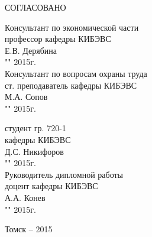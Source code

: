 \begin{singlespace}
 \begin{minipage}{0.48\linewidth}
 СОГЛАСОВАНО
 
 Консультант по экономической части\\
 профессор кафедры КИБЭВС \\
 \underline{\hspace{2.5cm}}Е.В. Дерябина \\
 "\underline{\hspace{1cm}}"\underline{\hspace{3cm}} 2015г.\\

 Консультант по вопросам охраны труда\\
 ст. преподаватель кафедры КИБЭВС \\
 \underline{\hspace{2.5cm}}М.А. Сопов \\
 "\underline{\hspace{1cm}}"\underline{\hspace{3cm}} 2015г.\\
 \end{minipage}
 \hfill
 \begin{minipage}{0.42\linewidth}
 студент гр. 720-1 \\
 кафедры КИБЭВС \\
 \underline{\hspace{2.5cm}}Д.С. Никифоров \\
 "\underline{\hspace{1cm}}"\underline{\hspace{3cm}} 2015г.\\
 
 Руководитель дипломной работы \\
 доцент кафедры КИБЭВС \\
 \underline{\hspace{2.5cm}}А.А. Конев \\
 "\underline{\hspace{1cm}}"\underline{\hspace{3cm}} 2015г.\\
 \end{minipage}
\end{singlespace}

\vfill
\begin{center}
Томск -- 2015
\end{center}